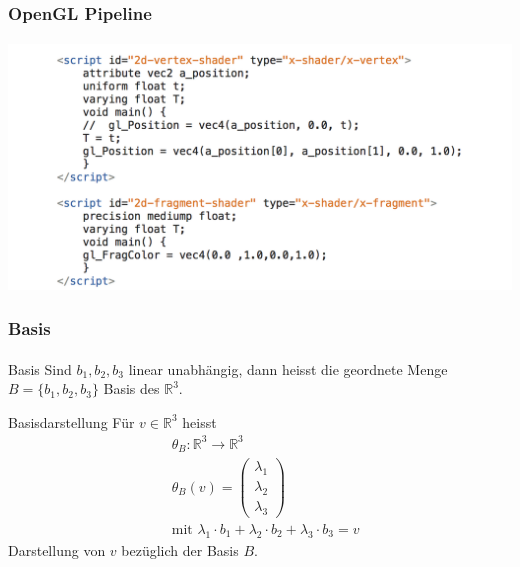 \documentclass{beamer}
\begin{document}
\begin{frame}
    \frametitle{OpenGL Pipeline}
\framesubtitle{}
    \begin{block}{}
\begin{center}
\includegraphics[scale=0.56]{images/shader}
\end{center}
\end{block}
\end{frame}

\begin{frame}
    \frametitle{Basis}
\framesubtitle{}
    \begin{block}{Basis}
Sind $b_1, b_2, b_3$ linear unabhängig, dann heisst die geordnete Menge
$ B = \{ b_1 , b_2, b_3\}$ Basis des $\mathbb{R}^3$.
\end{block}
 \begin{block}{Basisdarstellung}
Für $v \in \mathbb{R}^3$ heisst
\begin{eqnarray*}
& \theta_B : \mathbb{R}^3 \to  \mathbb{R}^3 \\
& \theta_B(v) =  \begin{pmatrix}
 \lambda_1 \\ \lambda_2 \\ \lambda_3
\end{pmatrix}  \\
& \text{mit } \lambda_1 \cdot b_1 + \lambda_2 \cdot b_2  + \lambda_3 \cdot b_3 = v 
\end{eqnarray*}
Darstellung von $v$ bezüglich der Basis $B$.
\end{block}

\end{frame}
\end{document}
